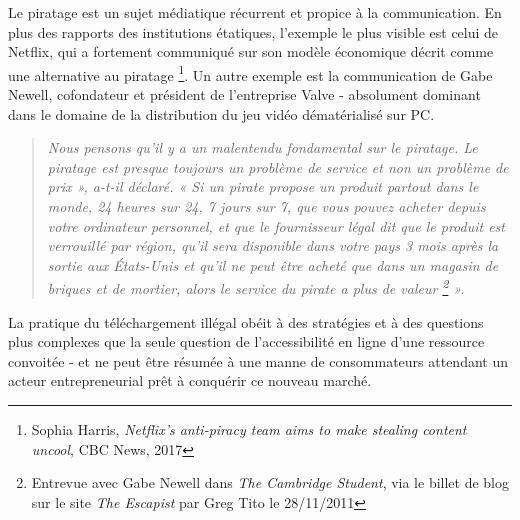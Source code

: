 Le piratage est un sujet médiatique récurrent et propice à la communication. En plus des rapports des institutions étatiques, l'exemple le plus visible est celui de Netflix, qui a fortement communiqué sur son modèle économique décrit comme une \guillemetleft alternative au piratage \guillemetright \footnote{Sophia Harris, \textit{Netflix's anti-piracy team aims to make stealing content uncool}, CBC News, 2017}. Un autre exemple est la communication de Gabe Newell, cofondateur et président de l'entreprise Valve - absolument dominant dans le domaine de la distribution du jeu vidéo dématérialisé sur PC.

\begin{quote}
    \textit{Nous pensons qu'il y a un malentendu fondamental sur le piratage. Le piratage est presque toujours un problème de service et non un problème de prix », a-t-il déclaré. « Si un pirate propose un produit partout dans le monde, 24 heures sur 24, 7 jours sur 7, que vous pouvez acheter depuis votre ordinateur personnel, et que le fournisseur légal dit que le produit est verrouillé par région, qu'il sera disponible dans votre pays 3 mois après la sortie aux États-Unis et qu'il ne peut être acheté que dans un magasin de briques et de mortier, alors le service du pirate a plus de valeur \footnote{Entrevue avec Gabe Newell dans \textit{The Cambridge Student}, via le billet de blog sur le site \textit{The Escapist} par Greg Tito le 28/11/2011} ».}
\end{quote}

La pratique du téléchargement illégal obéit à des stratégies et à des questions plus complexes que la seule question de l'accessibilité en ligne d'une ressource convoitée - et ne peut être résumée à une manne de consommateurs attendant un acteur entrepreneurial prêt à conquérir ce nouveau marché. 

